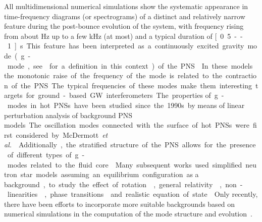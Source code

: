 
All multidimensional numerical simulations show the systematic appearance in time-frequency diagrams (or spectrograms) of a distinct and relatively narrow feature 
%
%
during the post-bounce evolution of the system, with frequency rising 
from about \unit[100]{Hz} up to a few kHz (at most) and a typical duration of \unit[0.5 -- 1]{s}. This feature has been interpreted as a continuously excited gravity mode (g-mode, see~\citep{kokkotas,Friedman:2013} for a definition in this context) of the PNS~\citep{murphy:09, mueller:13gw, Cerda:2013, Yakunin:2015wra, Kuroda:2016, Andresen:2017}. 
In these models the monotonic raise of the frequency of the mode is related to the contraction of the PNS. The {typical} frequencies of {these} modes make them interesting targets for ground-based GW interferometers. 
 
 The {properties of} g-modes in hot {PNSs} have been studied since the 1990s {by means of linear perturbation analysis of background PNS models}. The oscillation modes connected with the surface of hot PNSs were first considered by McDermott {\it et al.}~\citep{McDermott:1983}. Additionally, the stratified structure of the PNS allows for the presence of different types of g-modes related to the fluid core~\citep{Reisenegger:1992}. Many subsequent works used simplified neutron star models assuming an equilibrium configuration {as a background}, to study the effect of rotation~\citep{Ferrari:2004}, general relativity \citep{Passamonti:2005}, non-linearities~\citep{Dimmelmeier:2006}, phase transitions~\citep{Kruger:2015} and realistic equation of state~\citep{Camelio:2017}. {Only recently, there have been efforts to incorporate more suitable backgrounds based on numerical simulations in the computation of the mode structure and evolution~\citep{Sotani:2016,Torres:2018, Morozova:2018, Torres:2019a,Torres:2019b,Sotani:2019,WS:2019,Sotani:2020a, Sotani:2020b}}.
 
